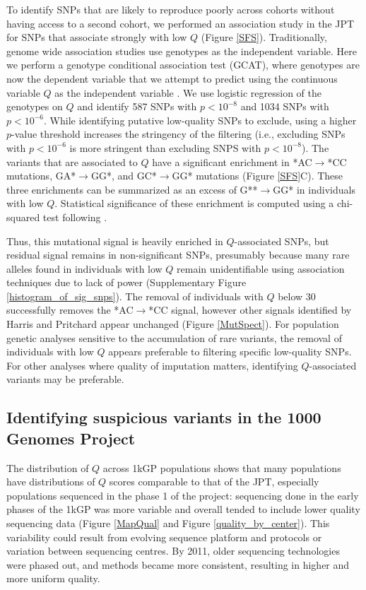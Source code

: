 \documentclass[9pt,lineno]{template}
\begin{document}
To identify SNPs that are likely to reproduce poorly across cohorts without having access to a second cohort, we performed an association study in the JPT for SNPs that associate strongly with low $Q$ (Figure \ref{SFS}).
Traditionally, genome wide association studies use genotypes as the independent variable. 
Here we perform a genotype conditional association test (GCAT), where genotypes are now the dependent variable that we attempt to predict using the continuous variable $Q$ as the independent variable \citep{song2015testing}.
We use logistic regression of the genotypes on $Q$ and identify 587 SNPs with $p < 10^{-8}$ and 1034 SNPs with $ p < 10^{-6}$. 
While identifying putative low-quality SNPs to exclude, using a higher $p$-value threshold increases the stringency of the filtering (i.e., excluding SNPs with $ p < 10^{-6}$ is more stringent than excluding SNPS with $p < 10^{-8}$). 
The variants that are associated to $Q$ have a significant enrichment in *AC${\rightarrow}$*CC mutations, GA*${\rightarrow}$GG*, and GC*${\rightarrow}$GG* mutations (Figure \ref{SFS}C).
These three enrichments can be summarized as an excess of G**${\rightarrow}$GG* in individuals with low $Q$.
Statistical significance of these enrichment is computed using a chi-squared test following \cite{Harris2017a}.

Thus, this mutational signal is heavily enriched in $Q$-associated SNPs, but residual signal remains in non-significant SNPs, presumably because many rare alleles found in individuals with low $Q$ remain unidentifiable using association techniques due to lack of power (Supplementary Figure \ref{histogram_of_sig_snps}).
The removal of individuals with $Q$ below 30 successfully removes the *AC${\rightarrow}$*CC signal, however other signals identified by Harris and Pritchard appear unchanged (Figure \ref{MutSpect}).
For population genetic analyses sensitive to the accumulation of rare variants, the removal of individuals with low $Q$ appears preferable to filtering specific low-quality SNPs. 
For other analyses where quality of imputation matters, identifying $Q$-associated variants may be preferable. 

\subsection{Identifying suspicious variants in the 1000 Genomes Project}
The distribution of $Q$ across 1kGP populations shows that many populations have distributions of $Q$ scores comparable to that of the JPT, especially populations sequenced in the phase 1 of the project: sequencing done in the early phases of the 1kGP was more variable and overall tended to include lower quality sequencing data (Figure \ref{MapQual} and Figure \ref{quality_by_center}).
This variability could result from evolving sequence platform and protocols or variation between sequencing centres. 
By 2011, older sequencing technologies were phased out, and methods became more consistent, resulting in higher and more uniform quality.
\end{document}
